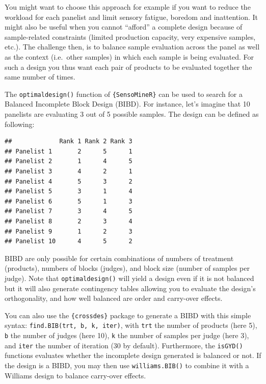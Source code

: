 \documentclass[
]{krantz}
\makeatletter
\newenvironment{Shaded}{\begin{snugshade}}{\end{snugshade}}
\newcommand{\AttributeTok}[1]{\textcolor[rgb]{0.61,0.61,0.61}{#1}}
\newcommand{\DecValTok}[1]{\textcolor[rgb]{0.06,0.06,0.06}{#1}}
\newcommand{\FunctionTok}[1]{\textcolor[rgb]{0,0,0}{#1}}
\newcommand{\NormalTok}[1]{#1}
\newcommand{\OtherTok}[1]{\textcolor[rgb]{0.37,0.37,0.37}{#1}}
\newcommand{\SpecialCharTok}[1]{\textcolor[rgb]{0,0,0}{#1}}
\newenvironment{kframe}{%
\medskip{}
\setlength{\fboxsep}{.8em}
 \def\at@end@of@kframe{}%
 \ifinner\ifhmode%
  \def\at@end@of@kframe{\end{minipage}}%
  \begin{minipage}{\columnwidth}%
 \fi\fi%
 \def\FrameCommand##1{\hskip\@totalleftmargin \hskip-\fboxsep
 \colorbox{shadecolor}{##1}\hskip-\fboxsep
     \hskip-\linewidth \hskip-\@totalleftmargin \hskip\columnwidth}%
 \MakeFramed {\advance\hsize-\width
   \@totalleftmargin\z@ \linewidth\hsize
   \@setminipage}}%
 {\par\unskip\endMakeFramed%
 \at@end@of@kframe}
\renewenvironment{Shaded}{\begin{kframe}}{\end{kframe}}
\makeatother
\begin{document}
You might want to choose this approach for example if you want to reduce the workload for each panelist and limit sensory fatigue, boredom and inattention. It might also be useful when you cannot ``afford'' a complete design because of sample-related constraints (limited production capacity, very expensive samples, etc.). The challenge then, is to balance sample evaluation across the panel as well as the context (i.e.~other samples) in which each sample is being evaluated. For such a design you thus want each pair of products to be evaluated together the same number of times.

The \texttt{optimaldesign()} function of \texttt{\{SensoMineR\}} can be used to search for a Balanced Incomplete Block Design (BIBD). For instance, let's imagine that 10 panelists are evaluating 3 out of 5 possible samples. The design can be defined as following:

\begin{Shaded}
\end{Shaded}

\begin{verbatim}
##             Rank 1 Rank 2 Rank 3
## Panelist 1       2      5      1
## Panelist 2       1      4      5
## Panelist 3       4      2      1
## Panelist 4       5      3      2
## Panelist 5       3      1      4
## Panelist 6       5      1      3
## Panelist 7       3      4      5
## Panelist 8       2      3      4
## Panelist 9       1      2      3
## Panelist 10      4      5      2
\end{verbatim}

BIBD are only possible for certain combinations of numbers of treatment (products), numbers of blocks (judges), and block size (number of samples per judge). Note that \texttt{optimaldesign()} will yield a design even if it is not balanced but it will also generate contingency tables allowing you to evaluate the design's orthogonality, and how well balanced are order and carry-over effects.

You can also use the \texttt{\{crossdes\}} package to generate a BIBD with this simple syntax: \texttt{find.BIB(trt,\ b,\ k,\ iter)}, with \texttt{trt} the number of products (here 5), \texttt{b} the number of judges (here 10), \texttt{k} the number of samples per judge (here 3), and \texttt{iter} the number of iteration (30 by default). Furthermore, the \texttt{isGYD()} functions evaluates whether the incomplete design generated is balanced or not. If the design is a BIBD, you may then use \texttt{williams.BIB()} to combine it with a Williams design to balance carry-over effects.
\end{document}
